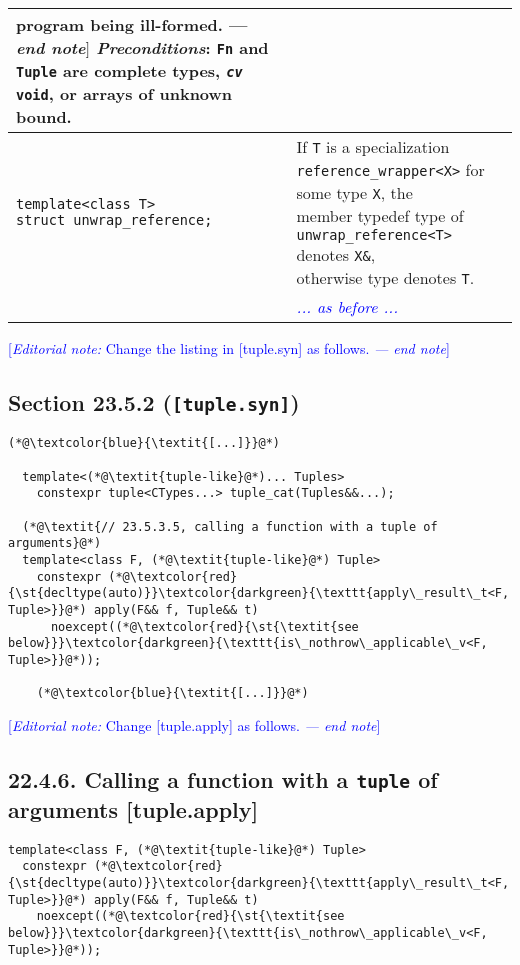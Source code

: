 \documentclass{article}
\begin{document}
\begin{center}
\begin{tabular}[t]{ | p{6cm} p{12cm} | }
{{                  program being ill-formed. --- \textit{end note}$]$ \\
                  \textit{Preconditions}: \texttt{Fn} and \texttt{Tuple} are complete types, \texttt{\textit{cv} void}, or arrays\\
                  of unknown bound.}} \\
    \hline
    \makecell[l]{\texttt{template<class T>} \\
                 \texttt{struct unwrap\_reference;}} &
    \makecell[l]{If \texttt{T} is a specialization \texttt{reference\_wrapper<X>} for some type \texttt{X}, the \\
                 member typedef type of \texttt{unwrap\_reference<T>} denotes \texttt{X\&}, \\
                 otherwise type denotes \texttt{T}.} \\
    \hline
    & \textcolor{blue}{\textit{... as before ...}} \\
    \hline
  \end{tabular}
\end{center}


\textcolor{blue}{[\textit{Editorial note:} Change the listing in [tuple.syn] as follows. \textit{--- end note}]}

\subsection{Section 23.5.2 (\texttt{[tuple.syn]})}
\begin{lstlisting}[style=base]
    (*@\textcolor{blue}{\textit{[...]}}@*)

  template<(*@\textit{tuple-like}@*)... Tuples>
    constexpr tuple<CTypes...> tuple_cat(Tuples&&...);

  (*@\textit{// 23.5.3.5, calling a function with a tuple of arguments}@*)
  template<class F, (*@\textit{tuple-like}@*) Tuple>
    constexpr (*@\textcolor{red}{\st{decltype(auto)}}\textcolor{darkgreen}{\texttt{apply\_result\_t<F, Tuple>}}@*) apply(F&& f, Tuple&& t)
      noexcept((*@\textcolor{red}{\st{\textit{see below}}}\textcolor{darkgreen}{\texttt{is\_nothrow\_applicable\_v<F, Tuple>}}@*));

    (*@\textcolor{blue}{\textit{[...]}}@*)
\end{lstlisting}

\textcolor{blue}{[\textit{Editorial note:} Change [tuple.apply] as follows. \textit{--- end note}]}

\subsection{22.4.6. Calling a function with a \texttt{tuple} of arguments [tuple.apply]}
\begin{lstlisting}
template<class F, (*@\textit{tuple-like}@*) Tuple>
  constexpr (*@\textcolor{red}{\st{decltype(auto)}}\textcolor{darkgreen}{\texttt{apply\_result\_t<F, Tuple>}}@*) apply(F&& f, Tuple&& t)
    noexcept((*@\textcolor{red}{\st{\textit{see below}}}\textcolor{darkgreen}{\texttt{is\_nothrow\_applicable\_v<F, Tuple>}}@*));
\end{lstlisting}
\end{document}
